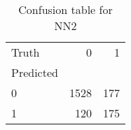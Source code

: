 \begin{table}[h!]
\caption{Confusion table for NN2}
\label{tab:NN2}
\begin{tabular}{lrr}
\toprule
Truth & 0 & 1 \\
Predicted &  &  \\
\midrule
0 & 1528 & 177 \\
1 & 120 & 175 \\
\bottomrule
\end{tabular}
\end{table}
